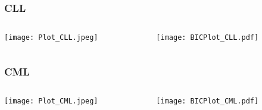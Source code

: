 \documentclass[10pt,dvipsnames,table, handout]{beamer} %
\begin{document}
\begin{frame}
\frametitle{CLL}
\begin{columns}
\begin{column}{5cm}
\texttt{[image: Plot\_CLL.jpeg]} \\
\end{column}
\begin{column}{5cm}
\pause \texttt{[image: BICPlot\_CLL.pdf]} \\
\end{column}
\end{columns}
\end{frame}

\begin{frame}
\frametitle{CML}
\begin{columns}
\begin{column}{5cm}
\texttt{[image: Plot\_CML.jpeg]} \\
\end{column}
\begin{column}{5cm}
\pause \texttt{[image: BICPlot\_CML.pdf]} \\
\end{column}
\end{columns}
\end{frame}
\end{document}
